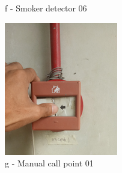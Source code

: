 \begin{figure}[!h]
\begin{minipage}[b]{0.22\linewidth}
		\caption*{f - Smoker detector 06}
	\end{minipage}
	\hspace{0.03cm}
	\begin{minipage}[b]{0.22\linewidth}
		\centering
		\includegraphics[width=\textwidth]{figures/ch05_fdas_mcp01}
		\caption*{g - Manual call point 01}
	\end{minipage}
	\hspace{0.03cm}
	\begin{minipage}[b]{0.22\linewidth}
		\centering

\end{minipage}
\end{figure}
